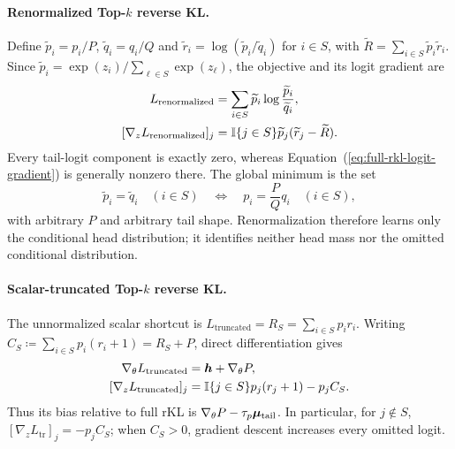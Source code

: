 \paragraph{Renormalized Top-$k$ reverse KL.}
Define $\widetilde p_i=p_i/P$, $\widetilde q_i=q_i/Q$ and
$\widetilde r_i=\log(\widetilde p_i/\widetilde q_i)$ for $i\in S$, with
$\widetilde R=\sum_{i\in S}\widetilde p_i\widetilde r_i$. Since
$\widetilde p_i=\exp (z_i)/\sum_{\ell\in S}\exp (z_\ell)$, the objective and its
logit gradient are
\begin{equation}
 \begin{aligned}
 L_{\mathrm{renormalized}}
 &=\sum_{i\in S}\widetilde p_i
   \log\frac{\widetilde p_i}{\widetilde q_i},\\
 [\nabla_z L_{\mathrm{renormalized}}]_j
 &=\mathbb{I}\{j\in S\}\widetilde p_j
   (\widetilde r_j-\widetilde R).
 \end{aligned}
 \label{eq:renorm-topk-gradient}
\end{equation}
Every tail-logit component is exactly zero, whereas
Equation~(\ref{eq:full-rkl-logit-gradient}) is generally nonzero there. The
global minimum is the set
\begin{equation}
 \widetilde p_i=\widetilde q_i
 \quad(i\in S)
 \quad\Longleftrightarrow\quad
 p_i=\frac{P}{Q}q_i\quad(i\in S),
 \label{eq:renorm-topk-optimum}
\end{equation}
with arbitrary $P$ and arbitrary tail shape. Renormalization therefore learns
only the conditional head distribution; it identifies neither head mass nor
the omitted conditional distribution.

\paragraph{Scalar-truncated Top-$k$ reverse KL.}
The unnormalized scalar shortcut is
$L_{\mathrm{truncated}}=R_S=\sum_{i\in S}p_i r_i$. Writing
$C_S\coloneqq\sum_{i\in S}p_i(r_i+1)=R_S+P$, direct differentiation gives
\begin{equation}
 \begin{aligned}
 \nabla_\theta L_{\mathrm{truncated}}
 &=\bm{h}+\nabla_\theta P,\\
 [\nabla_z L_{\mathrm{truncated}}]_j
 &=\mathbb{I}\{j\in S\}p_j(r_j+1)-p_jC_S.
 \end{aligned}
 \label{eq:scalar-truncated-gradient}
\end{equation}
Thus its bias relative to full rKL is
$\nabla_\theta P-\tau_p\bm{\mu}_{\mathrm{tail}}$. In particular, for
$j\notin S$, $[\nabla_z L_{\mathrm{tr}}]_j=-p_jC_S$; when $C_S>0$,
gradient descent increases every omitted logit.

